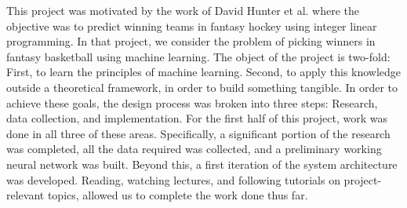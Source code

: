 This project was motivated by the work of David Hunter et al. \cite{picking_winners} where the objective was to predict winning teams in fantasy hockey using integer linear programming. In that project, we consider the problem of picking winners in fantasy basketball using machine learning. The object of the project is two-fold: First, to learn the principles of machine learning. Second, to apply this knowledge outside a theoretical framework, in order to build something tangible. In order to achieve these goals, the design process was broken into three steps: Research, data collection, and implementation. For the first half of this project, work was done in all three of these areas. Specifically, a significant portion of the research was completed, all the data required was collected, and a preliminary working neural network was built. Beyond this, a first iteration of the system architecture was developed. Reading, watching lectures, and following tutorials on project-relevant topics, allowed us to complete the work done thus far.